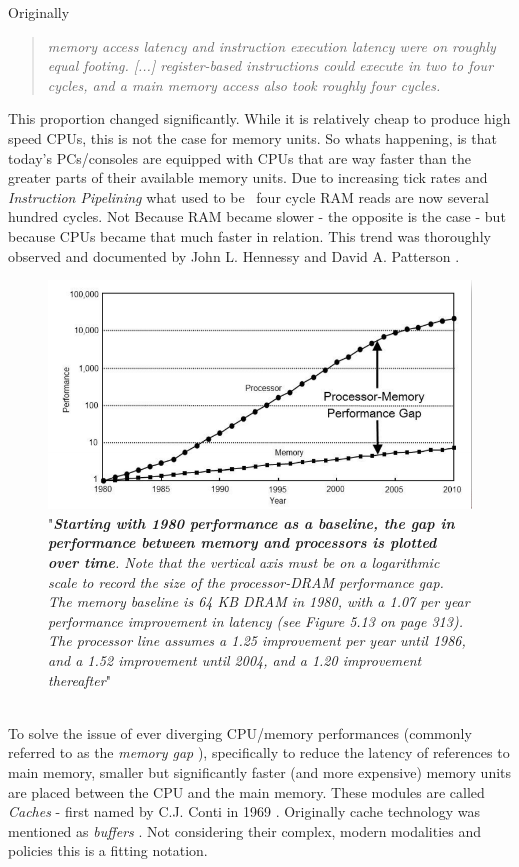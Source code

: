 Originally
\begin{quote}
	\textit{memory access latency and instruction execution latency were on roughly equal footing. [...] register-based instructions could execute in two to four cycles, and a main memory access also took roughly four cycles.} 
\end{quote}
This proportion changed significantly. While it is relatively cheap to produce high speed CPUs, this is not the case for memory units. So whats happening, is that today's PCs/consoles are equipped with CPUs that are way faster than the greater parts of their available memory units. Due to increasing tick rates and \textit{Instruction Pipelining} what used to be ~four cycle RAM reads are now several hundred cycles. Not Because RAM became slower - the opposite is the case - but because CPUs became that much faster in relation.
This trend was thoroughly observed and documented by John L. Hennessy and David A. Patterson .\\
\begin{figure}[!htbp]
	\centering
	\includegraphics[width=0.7\linewidth]{PICs/cpu_memory_gap}
	\caption{"\textit{\textbf{Starting with 1980 performance as a baseline, the gap in performance
			between memory and processors is plotted over time}.
			Note that the vertical axis
			must be on a logarithmic scale to record the size of the processor-DRAM performance
			gap. The memory baseline is 64 KB DRAM in 1980, with a 1.07 per year performance
			improvement in latency (see Figure 5.13 on page 313). The processor line assumes a
			1.25 improvement per year until 1986, and a 1.52 improvement until 2004, and a 1.20
			improvement thereafter}" }\label{cpu_memory_gap}
\end{figure}\\
To solve the issue of ever diverging CPU/memory performances (commonly referred to as the \textit{memory gap }), specifically to reduce the latency of references to main memory, smaller but significantly faster (and more expensive) memory units are placed between the CPU and the main memory. These modules are called \textit{Caches} - first named by C.J. Conti in 1969 . Originally cache technology was mentioned as \textit{buffers} . Not considering their complex, modern modalities and policies this is a fitting notation.\\
